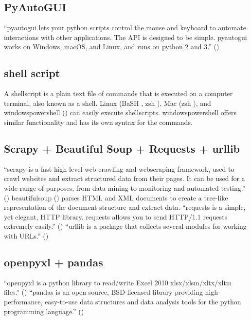\documentclass[10pt, letterpaper, twoside]{article}
\begin{document}
\subsection{PyAutoGUI}\label{sec:pyautogui}
\enquote{\Gls{pyautogui} lets your \Gls{python} scripts control the mouse and keyboard to automate interactions with other applications. The API is designed to be simple. \Gls{pyautogui} works on Windows, macOS, and Linux, and runs on \Gls{python} 2 and 3.} (\cite{pyautogui})
\subsection{shell script}\label{sec:shell_script}
A \gls{shellscript} is a plain text file of commands that is executed on a computer terminal, also known as a shell. Linux (BaSH \cite{bash}, zsh \cite{zsh}), Mac (zsh \cite{zsh}), and \Gls{windowspowershell} (\cite{windowspowershell}) can easily execute \glspl{shellscript}. \Gls{windowspowershell} offers similar functionality and has its own syntax for the commands.
\subsection{Scrapy + Beautiful Soup + Requests + urllib}\label{sec:scrapy}
\enquote{\Gls{scrapy} is a fast high-level web crawling and \gls{webscraping} framework, used to crawl websites and extract structured data from their pages. It can be used for a wide range of purposes, from data mining to monitoring and automated testing.} (\cite{scrapy}) \Gls{beautifulsoup} (\cite{beautifulsoup}) parses HTML and XML documents to create a tree-like representation of the document structure and extract data. \enquote{\Gls{requests} is a simple, yet elegant, HTTP library. \Gls{requests} allows you to send HTTP/1.1 requests extremely easily.} (\cite{requests}) \enquote{\gls{urllib} is a package that collects several modules for working with URLs.} (\cite{urllib})
\subsection{openpyxl + pandas}\label{sec:openpyxl_pandas}
\enquote{\gls{openpyxl} is a \Gls{python} library to read/write Excel 2010 xlsx/xlsm/xltx/xltm files.} (\cite{openpyxl})  \enquote{\gls{pandas} is an open source, BSD-licensed library providing high-performance, easy-to-use data structures and data analysis tools for the \Gls{python} programming language.} (\cite{pandas})
\end{document}
